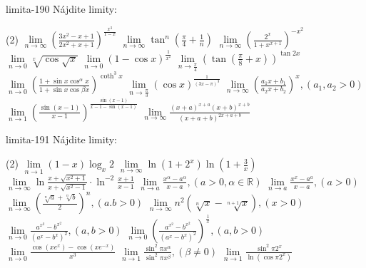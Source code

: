 \begin{defproblem}{limita-190}
Nájdite limity:
\begin{tasks}(2)
    \task $\lim\limits_{n \rightarrow \infty} (\frac{3x^2-x+1}{2x^2+x+1})^{\frac{x^3}{1-x}}$
    \task $\lim\limits_{n \rightarrow \infty} \tan ^n (\frac{\pi}{4}+\frac{1}{n})$
    \task $\lim\limits_{n \rightarrow \infty} (\frac{2^x}{1+x^{x+1}})^{-x^2}$
    \task $\lim\limits_{n \rightarrow 0} \sqrt[x]{\cos \sqrt{x}}$
    \task $\lim\limits_{n \rightarrow 0} (1-\cos x)^{\frac{1}{x^2}}$
    \task $\lim\limits_{n \rightarrow \frac{\pi}{4}} (\tan (\frac{\pi}{8}+x))^{\tan 2x}$
    \task $\lim\limits_{n \rightarrow 0} (\frac{1+\sin x \cos ^ \alpha x}{1+\sin x \cos \beta x})^{\coth ^3 x}$
    \task $\lim\limits_{n \rightarrow \frac{\pi}{3}} (\cos x)^{\frac{1}{(3x-\pi)^3}}$
    \task $\lim\limits_{n \rightarrow \infty} (\frac{a_1x+b_1}{a_2x+b_2})^x,(a_1,a_2>0)$
    \task $\lim\limits_{n \rightarrow 1} (\frac{\sin (x-1)}{x-1})^{\frac{\sin (x-1)}{x-1-\sin (x-1)}}$
    \task $\lim\limits_{n \rightarrow \infty} \frac{(x+a)^{x+a}(x+b)^{x+b}}{(x+a+b)^{2x+a+b}}$
\end{tasks}
\end{defproblem}

\begin{defproblem}{limita-191}
Nájdite limity:
\begin{tasks}(2)
    \task $\lim\limits_{n \rightarrow 1} (1-x)\log_x 2$
    \task $\lim\limits_{n \rightarrow \infty} \ln (1+2^x) \ln (1+\frac{3}{x})$
    \task $\lim\limits_{n \rightarrow \infty} \ln \frac{x+\sqrt{x^2+1}}{x+\sqrt{x^2-1}} \cdot \ln ^{-2} \frac{x+1}{x-1}$
    \task $\lim\limits_{n \rightarrow a} \frac{x^\alpha-a^\alpha}{x-a},(a>0,\alpha \in \mathbb{R})$
    \task $\lim\limits_{n \rightarrow a} \frac{x^x-a^a}{x-a},(a>0)$
    \task $\lim\limits_{n \rightarrow \infty} (\frac{\sqrt[n]{a}+\sqrt[n]{b}}{2})^n,(a.b>0)$
    \task $\lim\limits_{n \rightarrow \infty} n^2(\sqrt[n]{x}-\sqrt[n+1]{x}),(x>0)$
    \task $\lim\limits_{n \rightarrow 0} \frac{a^{x^2}-b^{x^2}}{(a^x-b^x)^2},(a,b>0)$
    \task $\lim\limits_{n \rightarrow 0} (\frac{a^{x^2}-b^{x^2}}{(a^x-b^x)^2})^{\frac{1}{x}},(a,b>0)$
    \task $\lim\limits_{n \rightarrow 0} \frac{\cos (xe^x)-\cos (xe^{-x})}{x^3}$
    \task $\lim\limits_{n \rightarrow 1} \frac{\sin ^2 \pi x^\alpha}{\sin ^2 \pi x^\beta},(\beta \neq 0)$
    \task $\lim\limits_{n \rightarrow 1} \frac{\sin ^2 \pi 2^{x}}{\ln (\cos \pi 2^{x})}$
\end{tasks}
\end{defproblem}


